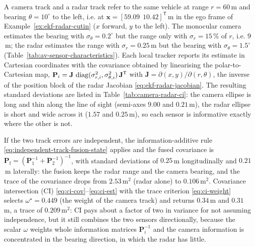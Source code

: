 \begin{example}
\label{ex:camera-radar-ci}
A camera track and a radar track refer to the same vehicle at range $r=60$\,m and bearing $\theta=10^{\circ}$ to the left, i.e. at $\mathbf{x}=[59.09\ \ 10.42]^{\mathsf T}$\,m in the ego frame of Example~\ref{ex:ekf-radar-cutin} ($x$ forward, $y$ to the left). The monocular camera estimates the bearing with $\sigma_{\theta}=0.2^{\circ}$ but the range only with $\sigma_{r}=15$\,\% of $r$, i.e. $9$\,m; the radar estimates the range with $\sigma_{r}=0.25$\,m but the bearing with $\sigma_{\theta}=1.5^{\circ}$ (Table~\ref{tab:av-sensor-characteristics}). Each local tracker reports its estimate in Cartesian coordinates with the covariance obtained by linearising the polar-to-Cartesian map, $\mathbf{P}_{i}=\mathbf{J}\,\operatorname{diag}(\sigma_{r,i}^{2},\sigma_{\theta,i}^{2})\,\mathbf{J}^{\mathsf T}$ with $\mathbf{J}=\partial(x,y)/\partial(r,\theta)$, the inverse of the position block of the radar Jacobian \eqref{eq:ekf-radar-jacobian}. The resulting standard deviations are listed in Table~\ref{tab:camera-radar-ci}: the camera ellipse is long and thin along the line of sight (semi-axes $9.00$ and $0.21$\,m), the radar ellipse is short and wide across it ($1.57$ and $0.25$\,m), so each sensor is informative exactly where the other is not.

If the two track errors are independent, the information-additive rule \eqref{eq:independent-track-fusion-state} applies and the fused covariance is $\mathbf{P}_{\mathrm{f}}=(\mathbf{P}_{1}^{-1}+\mathbf{P}_{2}^{-1})^{-1}$, with standard deviations of $0.25$\,m longitudinally and $0.21$\,m laterally: the fusion keeps the radar range and the camera bearing, and the trace of the covariance drops from $2.53$\,m$^{2}$ (radar alone) to $0.106$\,m$^{2}$. Covariance intersection (CI) \eqref{eq:ci-cov}--\eqref{eq:ci-est} with the trace criterion \eqref{eq:ci-weight} selects $\omega^{\star}=0.449$ (the weight of the camera track) and returns $0.34$\,m and $0.31$\,m, a trace of $0.209$\,m$^{2}$: CI pays about a factor of two in variance for not assuming independence, but it still combines the two sensors directionally, because the scalar $\omega$ weights whole information matrices $\mathbf{P}_{i}^{-1}$ and the camera information is concentrated in the bearing direction, in which the radar has little.


\end{example}

